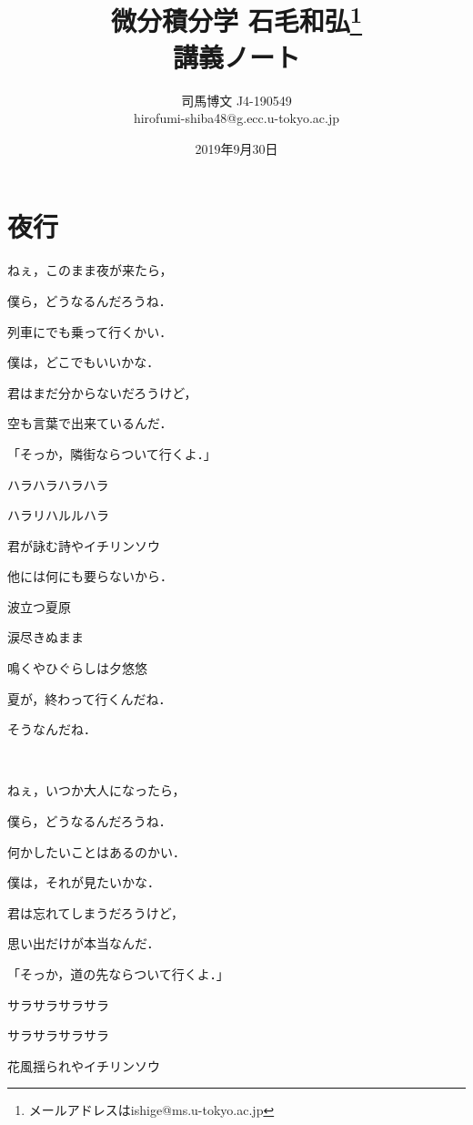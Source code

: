 \documentclass[uplatex, 12pt, dvipdfmx, twocolumn]{jsarticle}
\title{微分積分学 石毛和弘\thanks{メールアドレスはishige@ms.u-tokyo.ac.jp} \\ 講義ノート}
\author{司馬博文 J4-190549 \\ hirofumi-shiba48@g.ecc.u-tokyo.ac.jp}
\date{2019年9月30日}
\begin{document}
\section*{夜行}

ねぇ，このまま夜が来たら，

僕ら，どうなるんだろうね．

列車にでも乗って行くかい．

僕は，どこでもいいかな．

\vspace{\baselineskip}

君はまだ分からないだろうけど，

空も言葉で出来ているんだ．

「そっか，隣街ならついて行くよ．」

\vspace{\baselineskip}

ハラハラハラハラ

ハラリハルルハラ

君が詠む詩やイチリンソウ

他には何にも要らないから．

\vspace{\baselineskip}

波立つ夏原

涙尽きぬまま

鳴くやひぐらしは夕悠悠

夏が，終わって行くんだね．

そうなんだね．

\vspace{15cm}
　
\vspace{5.3mm}

ねぇ，いつか大人になったら，

僕ら，どうなるんだろうね．

何かしたいことはあるのかい．

僕は，それが見たいかな．

\vspace{\baselineskip}
\vspace{0.2mm}

君は忘れてしまうだろうけど，

思い出だけが本当なんだ．

「そっか，道の先ならついて行くよ．」

\vspace{\baselineskip}

サラサラサラサラ

サラサラサラサラ

花風揺られやイチリンソウ
\end{document}
